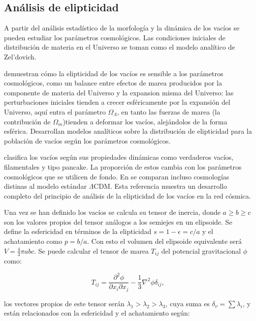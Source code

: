 \documentclass[preprint]{aastex62}
\begin{document}
  \subsection{Análisis de elipticidad}
  
  A partir del análisis estadístico de la morfología y la dinámica de los vacíos se pueden estudiar
  los parámetros cosmológicos. Las condiciones iniciales de distribución de materia en el Universo
  se toman como el modelo analítico de Zel'dovich. 

  \citet{https://arxiv.org/pdf/astro-ph/0610520.pdf}
  demuestran cómo la elipticidad de los vacíos
  es sensible a los parámetros cosmológicos, como un balance entre efectos de marea producidos
  por la componente de materia del Universo y la expansion misma del Universo: las perturbaciones
  iniciales tienden a crecer esféricamente por la expansión del Universo, aquí entra el parámetro
  $\Omega_\Lambda$, en tanto las fuerzas de marea (la contribución de $\Omega_m$)tienden a deformar
  los vacíos, alejándolos de la forma esférica. Desarrollan modelos analíticos sobre la distribución
  de elipticidad para la población de vacíos según los parámetros cosmológicos.

  \citet{https://arxiv.org/pdf/0906.4101.pdf} clasifica los vacíos
  según sus propiedades dinámicas como verdaderos vacíos, filamentales y tipo pancake.
  La proporción de estos cambia con los parámetros cosmológicos que se utilicen de fondo.
  En \citet{https://arxiv.org/pdf/1205.4238.pdf} se comparan incluso cosmologías distinas al modelo
  estándar $\Lambda$CDM. Esta referencia muestra un desarrollo completo del principio de análisis de
  la elipticidad de los vacíos en la red cósmica.

  Una vez se han definido los vacíos se calcula su tensor de inercia, donde $a \geq b \geq c$ son los
  valores propios del tensor análogos a los semiejes en un elipsoide. Se define la esfericidad en
  términos de la elipticidad $s = 1 - \epsilon = c / a$ y el achatamiento como $ p = b / a$. Con esto
  el volumen del elipsoide equivalente será $V = \frac{4}{3}\pi abc$. Se puede calcular el tensor de
  marea $T_{ij}$ del potencial gravitacional $\phi$ como:

  \begin{equation}
    T_{ij} = \frac{\partial^2 \phi}{\partial x_i \partial x_j} - \frac{1}{3} \nabla^2 \phi \delta_{ij},
  \end{equation}

  los vectores propios de este tensor serán  $\lambda_1 > \lambda_2 > \lambda_3$, cuya suma es
  $\delta_\nu = \sum \lambda_i$, y están relacionados con la esfericidad y el achatamiento según:
\end{document}
